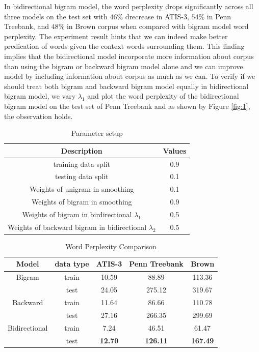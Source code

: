 \documentclass[11pt,a4paper]{article}
\begin{document}
In bidirectional bigram model, the word perplexity drops significantly across all three models on the test set
with $46\%$ drecrease in ATIS-3, $54\%$ in Penn Treebank, and $48\%$ in Brown corpus when compared with
bigram model word perplexity. The experiment result hints that we can indeed make better predication of words given the 
context words surrounding them. This finding implies that the bidirectional model incorporate more information about
corpus than using the bigram or backward bigram model alone and we can improve model by including information about corpus
as much as we can.
To verify if we should treat both bigram and backward bigram model equally in bidirectional
bigram model, we vary $\lambda_1$ and plot the word perplexity of the bidirectional bigram model
on the test set of Penn Treebank and as shown by Figure \ref{fig:1}, the observation holds.

\begin{table}
\captionsetup{size=footnotesize}
\caption{Parameter setup} \label{tab:freq}
\footnotesize\centering

\smallskip 
\begin{tabular*}{\columnwidth}{@{\extracolsep{\fill}}cc}
\toprule
  Description  & Values  \\
\midrule
 training data split & 0.9      \\
 testing data split & 0.1 \\
 Weights of unigram in smoothing & 0.1        \\
 Weights of bigram in smoothing & 0.9        \\
 Weights of bigram in birdirectional $\lambda_1$ & 0.5 \\
 Weights of backward bigram in bidirectional $\lambda_2$ & 0.5 \\
\bottomrule
\end{tabular*}
\end{table}

\begin{table}
\captionsetup{justification=centering}
\caption{Word Perplexity Comparison}
\label{tab:word-p}
\begin{tabular}{c|c|*3{c}}
\hline
Model & data type & ATIS-3 & Penn Treebank & Brown \\ \hline
Bigram & train & 10.59 & 88.89 & 113.36  \\ 
& test & 24.05  & 275.12  & 319.67 \\ \hline
Backward & train & 11.64  & 86.66  & 110.78  \\ 
& test & 27.16  & 266.35  & 299.69 \\ \hline
Bidirectional & train & 7.24 & 46.51 & 61.47 \\ 
& test & \textbf{12.70} & \textbf{126.11} & \textbf{167.49} \\ \hline
\end{tabular}
\end{table}
\end{document}
